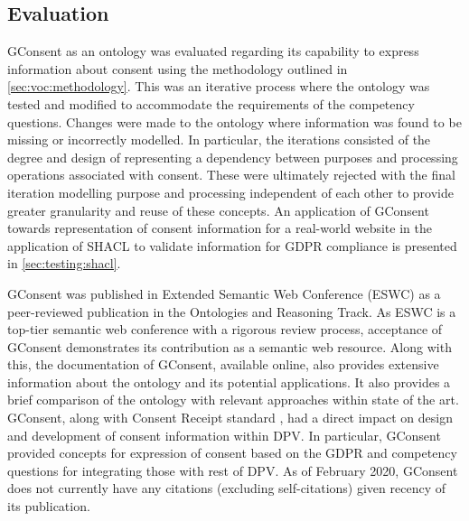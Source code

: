 \subsection{Evaluation}\label{sec:voc:gconsent:evaluation}
GConsent as an ontology was evaluated regarding its capability to express information about consent using the methodology outlined in \autoref{sec:voc:methodology}.
This was an iterative process where the ontology was tested and modified to accommodate the requirements of the competency questions. Changes were made to the ontology where information was found to be missing or incorrectly modelled.
In particular, the iterations consisted of the degree and design of representing a dependency between purposes and processing operations associated with consent. These were ultimately rejected with the final iteration modelling purpose and processing independent of each other to provide greater granularity and reuse of these concepts.
An application of GConsent towards representation of consent information for a real-world website in the application of SHACL to validate information for GDPR compliance is presented in \autoref{sec:testing:shacl}.

GConsent was published in Extended Semantic Web Conference (ESWC) as a peer-reviewed publication \cite{pandit_gconsent_2019} in the Ontologies and Reasoning Track. As ESWC is a top-tier semantic web conference with a rigorous review process, acceptance of GConsent demonstrates its contribution as a semantic web resource.
Along with this, the documentation of GConsent, available online, also provides extensive information about the ontology and its potential applications. It also provides a brief comparison of the ontology with relevant approaches within state of the art.
GConsent, along with Consent Receipt standard \cite{lizar_consent_2017}, had a direct impact on design and development of consent information within DPV. In particular, GConsent provided concepts for expression of consent based on the GDPR and competency questions for integrating those with rest of DPV.
As of February 2020, GConsent does not currently have any citations (excluding self-citations) given recency of its publication.

